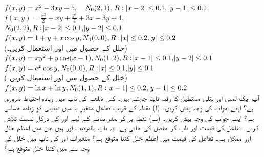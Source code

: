$f(x,y)=x^2-3xy+5,\quad N_0(2,1),\,R:\,\abs{x-2}\le 0.1,\,\abs{y-1}\le 0.1$
$f(x,y)=\tfrac{x^2}{2}+xy+\tfrac{y^2}{4}+3x-3y+4,$\\
$N_0(2,2),R:\abs{x-2}\le 0.1,\abs{y-2}\le 0.1$
$f(x,y)=1+y+x\cos y, N_0(0,0), R:\abs{x}\le 0.2, \abs{y}\le 0.2$\\
(خلل  کے حصول میں  اور  استعمال کریں۔)
$f(x,y)=xy^2+y\cos(x-1), N_0(1,2), R:\abs{x-1}\le 0.1, \abs{y-2}\le 0.1$
$f(x,y)=e^x\cos y, N_0(0,0), R:\abs{x}\le 0.1,\abs{y}\le 0.1$\\
(خلل  کے حصول میں  اور  استعمال کریں۔)
$f(x,y)=\ln x+\ln y, N_0(1,1), R:\abs{x-1}\le 0.2,\abs{y-1}\le 0.2$
\\
آپ ایک لمبی  اور  پتلی مستطیل کا رقبہ ناپنا چاہتے ہیں۔ کس  ضلعے  کی ناپ میں زیادہ احتیاط   ضروری ہے؟ اپنے جواب کی وجہ پیش کریں۔
(ا) نقطہ  کے قریب تفاعل  متغیر  یا   میں تبدیلی کو زیادہ حساس ہے؟ اپنے جواب کی وجہ پیش کریں۔ (ب) نقطہ  پر  کو صفر بنانے کے لیے  اور   کی درکار نسبت تلاش کریں۔
تفاعل    کی قیمت  اور  ناپ کر حاصل کی جاتی ہے۔ یہ ناپ بالترتیب  اور  ہیں  جن میں اعظم خلل  اور  ممکن ہے۔ تفاعل کی قیمت میں اعظم خلل کتنا متوقع ہے؟
متغیرات  اور  کی ناپ میں  خلل کی وجہ سے   میں کتنا خلل متوقع ہے؟

